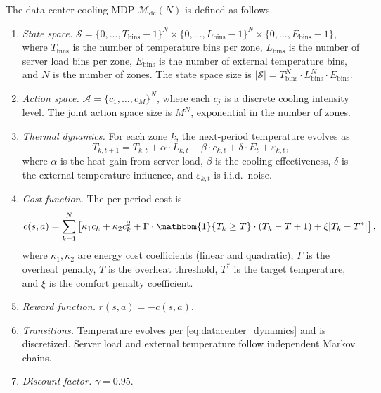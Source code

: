 \begin{definition}
\label{def:datacenter_mdp}
The data center cooling MDP $\mathcal{M}_{\mathrm{dc}}(N)$ is defined as follows.
\begin{enumerate}
    \item \emph{State space.} $\mathcal{S} = \{0, \ldots, T_{\mathrm{bins}}-1\}^N \times \{0, \ldots, L_{\mathrm{bins}}-1\}^N \times \{0, \ldots, E_{\mathrm{bins}}-1\}$, where $T_{\mathrm{bins}}$ is the number of temperature bins per zone, $L_{\mathrm{bins}}$ is the number of server load bins per zone, $E_{\mathrm{bins}}$ is the number of external temperature bins, and $N$ is the number of zones. The state space size is $|\mathcal{S}| = T_{\mathrm{bins}}^N \cdot L_{\mathrm{bins}}^N \cdot E_{\mathrm{bins}}$.
    \item \emph{Action space.} $\mathcal{A} = \{c_1, \ldots, c_M\}^N$, where each $c_j$ is a discrete cooling intensity level. The joint action space size is $M^N$, exponential in the number of zones.
    \item \emph{Thermal dynamics.} For each zone $k$, the next-period temperature evolves as
    \begin{equation}
    \label{eq:datacenter_dynamics}
    T_{k,t+1} = T_{k,t} + \alpha \cdot L_{k,t} - \beta \cdot c_{k,t} + \delta \cdot E_t + \varepsilon_{k,t},
    \end{equation}
    where $\alpha$ is the heat gain from server load, $\beta$ is the cooling effectiveness, $\delta$ is the external temperature influence, and $\varepsilon_{k,t}$ is i.i.d.\ noise.
    \item \emph{Cost function.} The per-period cost is
    \begin{equation}
    \label{eq:datacenter_cost}
    c(s, a) = \sum_{k=1}^{N} \left[ \kappa_1 c_k + \kappa_2 c_k^2 + \Gamma \cdot \mathbbm{1}\{T_k \geq \bar{T}\} \cdot (T_k - \bar{T} + 1) + \xi |T_k - T^*| \right],
    \end{equation}
    where $\kappa_1, \kappa_2$ are energy cost coefficients (linear and quadratic), $\Gamma$ is the overheat penalty, $\bar{T}$ is the overheat threshold, $T^*$ is the target temperature, and $\xi$ is the comfort penalty coefficient.
    \item \emph{Reward function.} $r(s, a) = -c(s, a)$.
    \item \emph{Transitions.} Temperature evolves per \eqref{eq:datacenter_dynamics} and is discretized. Server load and external temperature follow independent Markov chains.
    \item \emph{Discount factor.} $\gamma = 0.95$.
\end{enumerate}
\end{definition}

